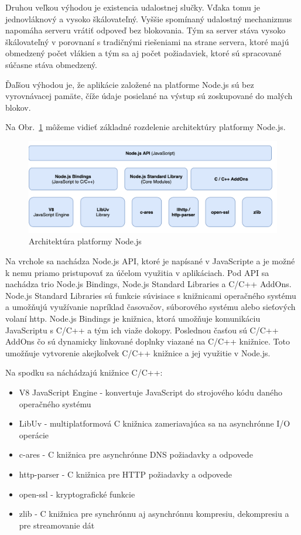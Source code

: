 \indent Druhou veľkou výhodou je existencia udalostnej slučky. Vďaka tomu je jednovláknový a vysoko škálovateľný. Vyššie spomínaný udalostný mechanizmus napomáha serveru vrátiť odpoveď bez blokovania. Tým sa server stáva vysoko škálovateľný v porovnaní s tradičnými riešeniami na strane servera, ktoré majú obmedzený počet vlákien a tým sa aj počet požiadaviek, ktoré sú spracované súčasne stáva obmedzený. 

\indent Ďaľšou výhodou je, že aplikácie založené na platforme Node.js sú bez vyrovnávacej pamäte, číže údaje posielané na výstup sú zoskupované do malých blokov.

\indent Na Obr.~\ref{fig:node_arch} môžeme vidieť základné rozdelenie architektúry platformy Node.js. 

\begin{figure}[H]
    \centering
    \includegraphics[scale=0.30]{img/node_architecture.png}
    \caption{Architektúra platformy Node.js}
    \label{fig:node_arch}
\end{figure}

\indent Na vrchole sa nachádza Node.js API, ktoré je napísané v JavaScripte a je možné k nemu priamo pristupovať za účelom využitia v aplikáciach. Pod API sa nachádza trio Node.js Bindings, Node.js Standard Libraries a C/C++ AddOns. Node.js Standard Libraries sú funkcie súvisiace s knižnicami operačného systému a umožňujú využívanie napríklad časovačov, súborového systému alebo sieťových volaní http. Node.js Bindings je knižnica, ktorá umožňuje komunikáciu JavaScriptu s C/C++ a tým ich viaže dokopy. Poslednou časťou sú C/C++ AddOns čo sú dynamicky linkované doplnky viazané na C/C++ knižnice. Toto umožňuje vytvorenie akejkoľvek C/C++ knižnice a jej využitie v Node.js. 

\indent Na spodku sa náchádzajú knižnice C/C++:
\begin{itemize}
    \item V8 JavaScript Engine - konvertuje JavaScript do strojového kódu daného operačného systému
    \item LibUv - multiplatformová C knižnica zameriavajúca sa na asynchrónne I/O operácie
    \item c-ares - C knižnica pre asynchrónne DNS požiadavky a odpovede
    \item http-parser - C knižnica pre HTTP požiadavky a odpovede
    \item open-ssl - kryptografické funkcie
    \item zlib - C knižnica pre synchrónnu aj asynchrónnu kompresiu, dekompresiu a pre streamovanie dát 
\end{itemize}

